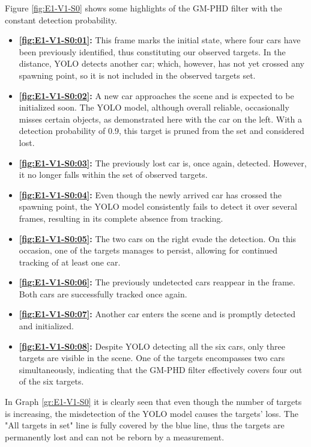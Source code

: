 Figure \ref{fig:E1-V1-S0} shows some highlights of the GM-PHD filter with the constant detection probability.
\begin{itemize}
    \item \textbf{\ref{fig:E1-V1-S0:01}:} This frame marks the initial state, where four cars have been previously
    identified, thus constituting our observed targets. In the distance, YOLO detects another car; which, however,
    has not yet crossed any spawning point, so it is not included in the observed targets set.
    \item \textbf{\ref{fig:E1-V1-S0:02}:} A new car approaches the scene and is expected to be initialized soon. The
    YOLO model, although overall reliable, occasionally misses certain objects, as demonstrated here with the
    car on the left. With a detection probability of 0.9, this target is pruned from the set and considered lost.
    \item \textbf{\ref{fig:E1-V1-S0:03}:} The previously lost car is, once again, detected. However, it no longer
    falls within the set of observed targets.
    \item \textbf{\ref{fig:E1-V1-S0:04}:} Even though the newly arrived car has crossed the spawning point, the YOLO model
    consistently
    fails to detect it over several frames, resulting in its complete absence from tracking.
    \item \textbf{\ref{fig:E1-V1-S0:05}:} The two cars on the right evade the detection. On this occasion, one
    of the targets manages to persist, allowing for continued tracking of at least one car.
    \item \textbf{\ref{fig:E1-V1-S0:06}:} The previously undetected cars reappear in the frame. Both cars are
    successfully tracked once again.
    \item \textbf{\ref{fig:E1-V1-S0:07}:} Another car enters the scene and is promptly detected and initialized.
    \item \textbf{\ref{fig:E1-V1-S0:08}:} Despite YOLO detecting all the six cars, only three targets are visible in the
    scene. One of the targets encompasses two cars simultaneously, indicating that the GM-PHD filter effectively covers four out of the six targets.
\end{itemize}

In Graph \ref{gr:E1-V1-S0} it is clearly seen that even though the number of targets is increasing, the misdetection
of the YOLO model causes the targets' loss. The "All targets in set" line is fully covered by the blue line, thus the
targets are permanently lost and can not be reborn by a measurement.

